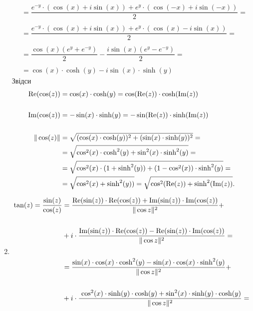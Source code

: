 \begin{solution}
\begin{enumerate}
\begin{align*}
            \\
            &= \dfrac{e^{-y} \cdot (\cos (x) + i \sin(x)) + e^{y} \cdot ( \cos (-x) + i \sin (-x) ) } 2 = \\
            \\
            &= \dfrac{e^{-y} \cdot (\cos (x) + i \sin(x)) + e^{y} \cdot ( \cos (x) - i \sin (x) ) } 2 = \\
            \\
            &= \dfrac{\cos (x) (e^y + e^{-y})}{2} - \dfrac{i \sin (x) (e^y - e^{-y})} 2 = \\
            \\
            &= \cos (x) \cdot \cosh(y) - i \sin(x) \cdot \sinh(y)
        \end{align*}
        Звідси 
        \begin{align*}
            \operatorname{Re}(\cos(z)) &= \cos (x) \cdot \cosh(y) = \cos (\operatorname{Re}(z)) \cdot \cosh(\operatorname{Im}(z)) \\
            \\
            \operatorname{Im}(\cos(z)) &= - \sin (x) \cdot \sinh(y) = - \sin (\operatorname{Re}(z)) \cdot \sinh(\operatorname{Im}(z)) \\
            \\
            \|\cos(z)\| &= \sqrt{(\cos(x) \cdot \cosh(y))^2 + (\sin(x) \cdot \sinh(y))^2} = \\
            &= \sqrt{\cos^2(x) \cdot \cosh^2(y) + \sin^2(x) \cdot \sinh^2(y)} = \\
            &= \sqrt{\cos^2(x) \cdot (1 + \sinh^2(y)) + (1 - \cos^2(x)) \cdot \sinh^2(y)} = \\
            &= \sqrt{\cos^2(x) + \sinh^2(y))} = \sqrt{\cos^2(\operatorname{Re}(z)) + \sinh^2(\operatorname{Im}(z))}.
        \end{align*}
        \item 
        \begin{align*}
            \tan (z) = \dfrac{\sin (z)}{\cos (z)} &= \dfrac{\Real(\sin(z)) \cdot \Real(\cos(z)) + \Imag(\sin(z)) \cdot \Imag(\cos(z))}{\|\cos z\|^2} + \\
            \\
            &+ i \cdot \dfrac{\Imag(\sin(z)) \cdot \Real(\cos(z)) - \Real(\sin(z)) \cdot \Imag(\cos(z))}{\|\cos z\|^2} = \\
            \\
            &= \dfrac{\sin (x) \cdot \cos (x) \cdot \cosh^2(y) - \sin (x) \cdot \cos (x) \cdot \sinh^2(y)}{\|\cos z\|^2} + \\
            \\
            &+ i \cdot \dfrac{\ \cos^2 (x) \cdot \sinh(y) \cdot \cosh(y) + \sin^2 (x) \cdot \sinh(y) \cdot \cosh(y)}{\|\cos z\|^2} =\\

\end{align*}
\end{enumerate}
\end{solution}
